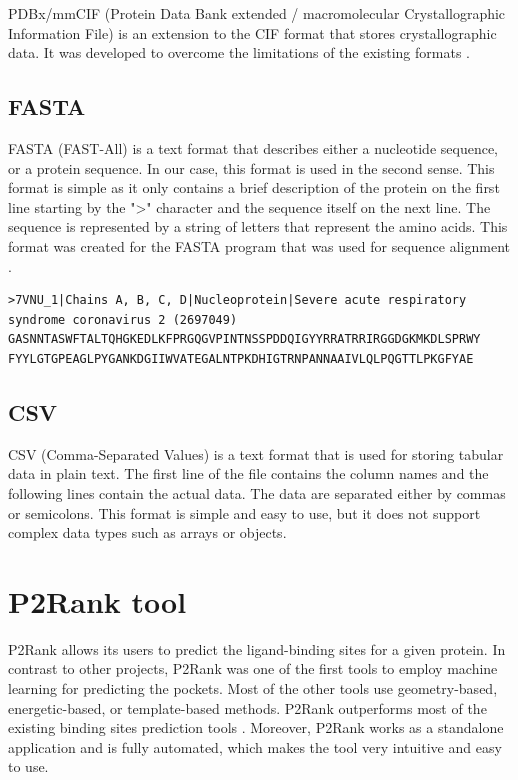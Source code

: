 PDBx/mmCIF (Protein Data Bank extended / macromolecular Crystallographic Information File) is an extension to the CIF format that stores crystallographic data. It was developed to overcome the limitations of the existing formats \cite{bourne199730}.

\subsection{FASTA}
\label{subsec:FASTA}

FASTA (FAST-All) is a text format that describes either a nucleotide sequence, or a protein sequence. In our case, this format is used in the second sense. This format is simple as it only contains a brief description of the protein on the first line starting by the ">" character and the sequence itself on the next line. The sequence is represented by a string of letters that represent the amino acids. This format was created for the FASTA program that was used for sequence alignment \cite{lipman1985rapid}.

\begin{lstlisting}[caption={
    An example of a FASTA file used for storing information about the 7VNU sequence.
}, breaklines=true, breakatwhitespace=false,escapechar=*]
>7VNU_1|Chains A, B, C, D|Nucleoprotein|Severe acute respiratory syndrome coronavirus 2 (2697049)
GASNNTASWFTALTQHGKEDLKFPRGQGVPINTNSSPDDQIGYYRRATRRIRGGDGKMKDLSPRWY FYYLGTGPEAGLPYGANKDGIIWVATEGALNTPKDHIGTRNPANNAAIVLQLPQGTTLPKGFYAE
\end{lstlisting}

\subsection{CSV}
\label{subsec:CSV}

CSV (Comma-Separated Values) is a text format that is used for storing tabular data in plain text. The first line of the file contains the column names and the following lines contain the actual data. The data are separated either by commas or semicolons. This format is simple and easy to use, but it does not support complex data types such as arrays or objects.

\section{P2Rank tool}
\label{sec:p2rank}

P2Rank allows its users to predict the ligand-binding sites for a given protein. In contrast to other projects, P2Rank was one of the first tools to employ machine learning for predicting the pockets. Most of the other tools use geometry-based, energetic-based, or template-based methods. P2Rank outperforms most of the existing binding sites prediction tools \cite{krivak2018p2rank}. Moreover, P2Rank works as a standalone application and is fully automated, which makes the tool very intuitive and easy to use.

